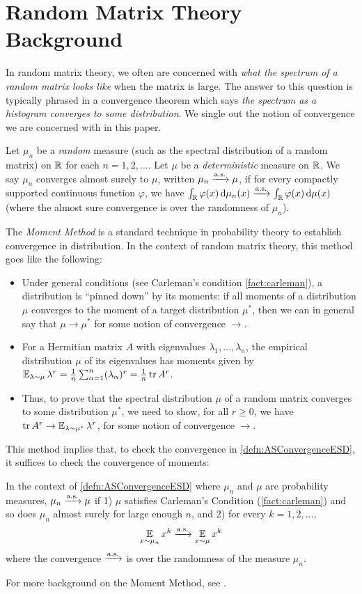 \documentclass[main.tex]{subfiles}
\begin{document}
\section{Random Matrix Theory Background}

In random matrix theory, we often are concerned with \emph{what the spectrum of a random matrix looks like} when the matrix is large.
The answer to this question is typically phrased in a convergence theorem which says \emph{the spectrum as a histogram converges to some distribution}.
We single out the notion of convergence we are concerned with in this paper.
\begin{defn}\label{defn:ASConvergenceESD}
    Let $\mu_n$ be a \emph{random} measure (such as the spectral distribution of a random matrix) on $\mathbb{R}$ for each $n=1,2,\ldots$.
    Let $\mu$ be a \emph{deterministic} measure on $\mathbb{R}$.
    We say $\mu_n$ converges almost surely to $\mu$, written $\mu_n \xrightarrow{\mathrm{a.s.}} \mu$, if for every compactly supported continuous function $\varphi$, we have $\int_{\mathbb{R}} \varphi(x)\mathop{}\!\mathrm{d} \mu_n(x) \xrightarrow{\mathrm{a.s.}} \int_{\mathbb{R}} \varphi(x) \mathop{}\!\mathrm{d} \mu(x)$ (where the almost sure convergence is over the randomness of $\mu_n$).
\end{defn}

The \emph{Moment Method} is a standard technique in probability theory to establish convergence in distribution.
In the context of random matrix theory, this method goes like the following:
\begin{itemize}
\item Under general conditions (see Carleman's condition \cref{fact:carleman}), a distribution is ``pinned down'' by its moments: if all moments of a distribution $\mu$ converges to the moment of a target distribution $\mu^{*}$, then we can in general say that $\mu\to\mu^{*}$ for some notion of convergence $\to$.
\item For a Hermitian matrix $A$ with eigenvalues $\lambda_1, \ldots, \lambda_n$, the empirical distribution $\mu$ of its eigenvalues has moments given by $\operatorname*{\mathbb{E}}_{\lambda\sim\mu}\lambda^{r} = \frac{1}{n} \sum_{\alpha=1}^n (\lambda_\alpha)^r =\frac{1}{n} \operatorname{tr} A^{r}$.
\item Thus, to prove that the spectral distribution $\mu$ of a random matrix converges to some distribution $\mu^*$, we need to show, for all $r\ge0$, we have $\operatorname{tr} A^{r}\to\operatorname*{\mathbb{E}}_{\lambda\sim\mu^*}\lambda^{r}$, for some notion of convergence $\to$.
\end{itemize}
This method implies that, to check the convergence in \cref{defn:ASConvergenceESD}, it suffices to check the convergence of moments:
\begin{fact}\label{fact:MomentMethod}
    In the context of \cref{defn:ASConvergenceESD} where $\mu_n$ and $\mu$ are probability measures, $\mu_n \xrightarrow{\mathrm{a.s.}} \mu$ if 1) $\mu$ satisfies Carleman's Condition (\cref{fact:carleman}) and so does $\mu_n$ almost surely for large enough $n$, and 2) for every $k = 1, 2, \ldots$,
    \[
        \operatorname*{\mathbb{E}}_{x\sim \mu_n} x^k \xrightarrow{\mathrm{a.s.}} \operatorname*{\mathbb{E}}_{x \sim \mu} x^k
        \]
    where the convergence $\xrightarrow{\mathrm{a.s.}}$ is over the randomness of the measure $\mu_n$.
\end{fact}
For more background on the Moment Method, see \cite{tao_topics_2012}.
\end{document}
